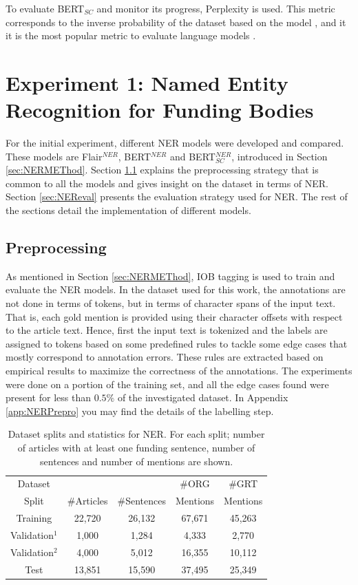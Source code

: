 \documentclass{report}
\theoremstyle{definition}
\theoremstyle{remark}
\begin{document}
To evaluate BERT$_{SC}$ and monitor its progress, Perplexity is used. This metric corresponds to the inverse probability of the dataset based on the model \cite{perplexity}, and it it is the most popular metric to evaluate language models \cite{perplexity}. 

\section{Experiment 1: Named Entity Recognition for Funding Bodies}

\label{sec:NERExperiment}
For the initial experiment, different NER models were developed and compared. These models are Flair$^{NER}$, BERT$^{NER}$ and BERT$^{NER}_{SC}$, introduced in Section \ref{sec:NERMEThod}. Section \ref{sec:NERpreprobasic} explains the preprocessing strategy that is common to all the models and gives insight on the dataset in terms of NER. Section \ref{sec:NEReval} presents the evaluation strategy used for NER. The rest of the sections detail the implementation of different models.

\subsection{Preprocessing}
\label{sec:NERpreprobasic}

As mentioned in Section \ref{sec:NERMEThod}, IOB tagging is used to train and evaluate the NER models. In the dataset used for this work, the annotations are not done in terms of tokens, but in terms of character spans of the input text. That is, each gold mention is provided using their character offsets with respect to the article text. Hence, first the input text is tokenized and the labels are assigned to tokens based on some predefined rules to tackle some edge cases that mostly correspond to annotation errors. These rules are extracted based on empirical results to maximize the correctness of the annotations. The experiments were done on a portion of the training set, and all the edge cases found were present for less than $0.5\%$ of the investigated dataset. In Appendix \ref{app:NERPrepro} you may find the details of the labelling step. 

\begin{table}[h!]
    \centering
    \begin{tabular}{ccccc}
    Dataset &  &  &\#ORG& \#GRT  \\
    Split & \#Articles & \#Sentences &Mentions&Mentions \\
    \hline
    Training   &22,720&26,132& 67,671 &45,263 \\
    Validation$^{1}$ &1,000&1,284&4,333&2,770\\
    Validation$^{2}$ &4,000&5,012&16,355 & 10,112\\
    Test & 13,851 & 15,590 &37,495&25,349\\
    \end{tabular}
    \caption{Dataset splits and statistics for NER. For each split; number of articles with at least one funding sentence, number of sentences and number of mentions are shown.}
    \label{tab:goldstatsner}
\end{table}
\end{document}
